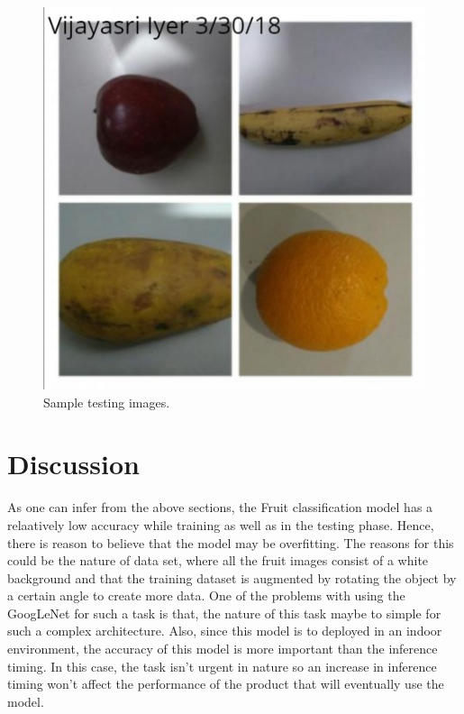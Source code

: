 \documentclass[10pt,journal,compsoc]{IEEEtran}
\begin{document}
\begin{figure}[tbhp]
      \centering
      \includegraphics[width=\linewidth]{test.png}
      \caption{Sample testing images.}
      \label{fig:robot1}
\end{figure}

\section{Discussion}
As one can infer from the above sections, the Fruit classification model has a relaatively low accuracy while training as well as in the testing phase. Hence, there is reason to believe that the model may be overfitting. The reasons for this could be the nature of data set, where all the fruit images consist of a white background and that the training dataset is augmented by rotating the object by a certain angle to create more data. One of the problems with using the GoogLeNet for such a task is that, the nature of this task maybe to simple for such a complex architecture. Also, since this model is to deployed in an indoor environment, the accuracy of this model is more important than the inference timing. In this case, the task isn't urgent in nature so an increase in inference timing won't affect the performance of the product that will eventually use the model.
\end{document}
